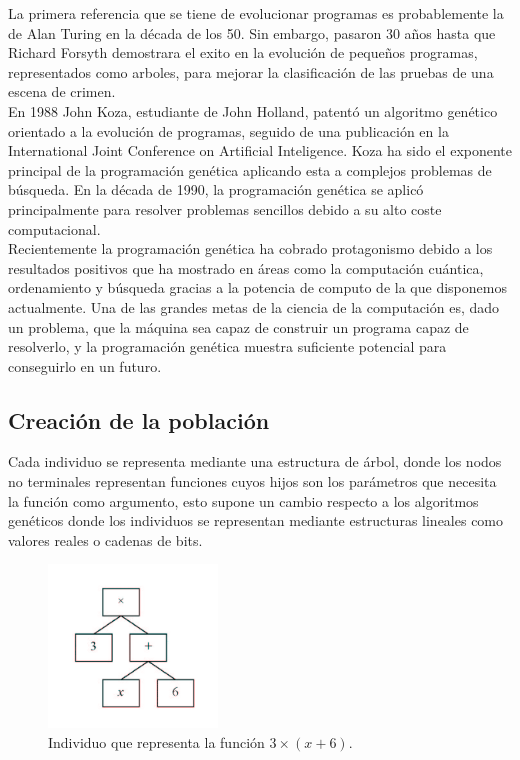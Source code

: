 \documentclass[12pt]{article} \usepackage[utf8x]{inputenc}
\begin{document}
La primera referencia que se tiene de evolucionar programas es probablemente la de Alan Turing en la década de los 50. Sin embargo, pasaron 30 años hasta que Richard Forsyth demostrara el exito en la evolución de pequeños programas, representados como arboles, para mejorar la clasificación de las pruebas de una escena de crimen.\\

En 1988 John Koza, estudiante de John Holland, patentó un algoritmo genético orientado a la evolución de programas, seguido de una publicación en la International Joint Conference on Artificial Inteligence. Koza ha sido el exponente principal de la programación genética aplicando esta a complejos problemas de búsqueda.
En la década de 1990, la programación genética se aplicó principalmente para resolver problemas sencillos debido a su alto coste computacional.\\

Recientemente la programación genética ha cobrado protagonismo debido a los resultados positivos que ha mostrado en áreas como la computación cuántica, ordenamiento y búsqueda gracias a la potencia de computo de la que disponemos actualmente. Una de las grandes metas de la ciencia de la computación es, dado un problema, que la máquina sea capaz de construir un programa capaz de resolverlo, y la programación genética muestra suficiente potencial para conseguirlo en un futuro.\\


\subsection {Creación de la población}

Cada individuo se representa mediante una estructura de árbol, donde los nodos no terminales representan funciones cuyos hijos son los parámetros que necesita la función como argumento, esto supone un cambio respecto a los algoritmos genéticos donde los individuos se representan mediante estructuras lineales como valores reales o cadenas de bits.

\begin{figure}[H]
    \centering
    \includegraphics[width=0.4\textwidth]{individuo.PNG}
    \caption{Individuo que representa la función \(3\times(x+6)\).}
    \label{fig:dfd:1}
\end{figure}
\end{document}
